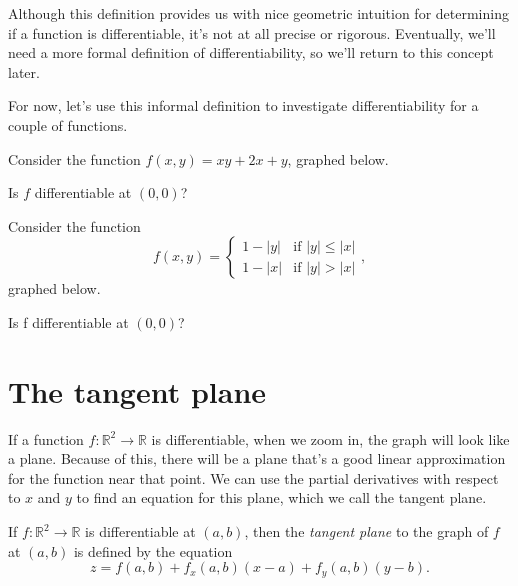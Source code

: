 \documentclass{ximera}
\begin{document}
Although this definition provides us with nice geometric intuition for determining if a function is differentiable, it's not at all precise or rigorous. Eventually, we'll need a more formal definition of differentiability, so we'll return to this concept later.

For now, let's use this informal definition to investigate differentiability for a couple of functions.

\begin{example}
Consider the function $f(x,y) = xy+2x+y$, graphed below.


Is $f$ differentiable at $(0,0)$?
\begin{multipleChoice}
\end{multipleChoice}

\end{example}

\begin{example}
Consider the function 
\[
f(x,y) = \begin{cases} 
      1-|y| & \text{if }|y|\leq |x| \\
      1-|x| & \text{if }|y| > |x|
   \end{cases},
\] graphed below.


Is f differentiable at $(0,0)$?
\begin{multipleChoice}
\end{multipleChoice}

\end{example}

\section*{The tangent plane}

If a function $f:\mathbb{R}^2\rightarrow\mathbb{R}$ is differentiable, when we zoom in, the graph will look like a plane. Because of this, there will be a plane that's a good linear approximation for the function near that point. We can use the partial derivatives with respect to $x$ and $y$ to find an equation for this plane, which we call the tangent plane.

\begin{definition}
If $f:\mathbb{R}^2\rightarrow\mathbb{R}$ is differentiable at $(a,b)$, then the \emph{tangent plane} to the graph of $f$ at $(a,b)$ is defined by the equation
\[
z=f(a,b)+f_x(a,b)(x-a)+f_y(a,b)(y-b).
\]
\end{definition}
\end{document}
